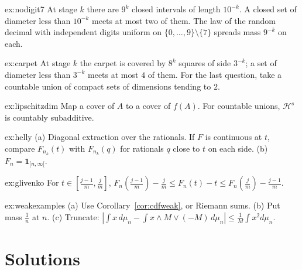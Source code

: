 \begin{hint}{ex:nodigit7}
At stage $k$ there are $9^k$ closed intervals of length $10^{-k}$. A closed set of diameter less than $10^{-k}$ meets at most two of them. The law of the random decimal with independent digits uniform on
$\{0,\ldots,9\}\setminus\{7\}$ spreads mass $9^{-k}$ on each.
\end{hint}
\begin{hint}{ex:carpet}
At stage $k$ the carpet is covered by $8^k$ squares of side $3^{-k}$; a set of diameter less than $3^{-k}$ meets at most $4$ of them. For the last question, take a countable union of compact sets of dimensions
tending to $2$.
\end{hint}
\begin{hint}{ex:lipschitzdim}
Map a cover of $A$ to a cover of $f(A)$. For countable unions, $\mathcal H^s$ is countably subadditive.
\end{hint}
\begin{hint}{ex:helly}
(a) Diagonal extraction over the rationals. If $F$ is continuous at $t$, compare $F_{n_k}(t)$ with $F_{n_k}(q)$ for rationals $q$ close to $t$ on each side. (b) $F_n=\mathbf 1_{[n,\infty[}$.
\end{hint}
\begin{hint}{ex:glivenko}
For $t\in[\frac{j-1}m,\frac jm]$, $F_n(\frac{j-1}m)-\frac jm\le F_n(t)-t\le F_n(\frac jm)-\frac{j-1}m$.
\end{hint}
\begin{hint}{ex:weakexamples}
(a) Use Corollary~\ref{cor:cdfweak}, or Riemann sums. (b) Put mass $\frac1n$ at $n$. (c) Truncate: $|\int x\,d\mu_n-\int x\wedge M\vee(-M)\,d\mu_n|\le\frac1M\int x^2d\mu_n$.
\end{hint}

\section{Solutions}

